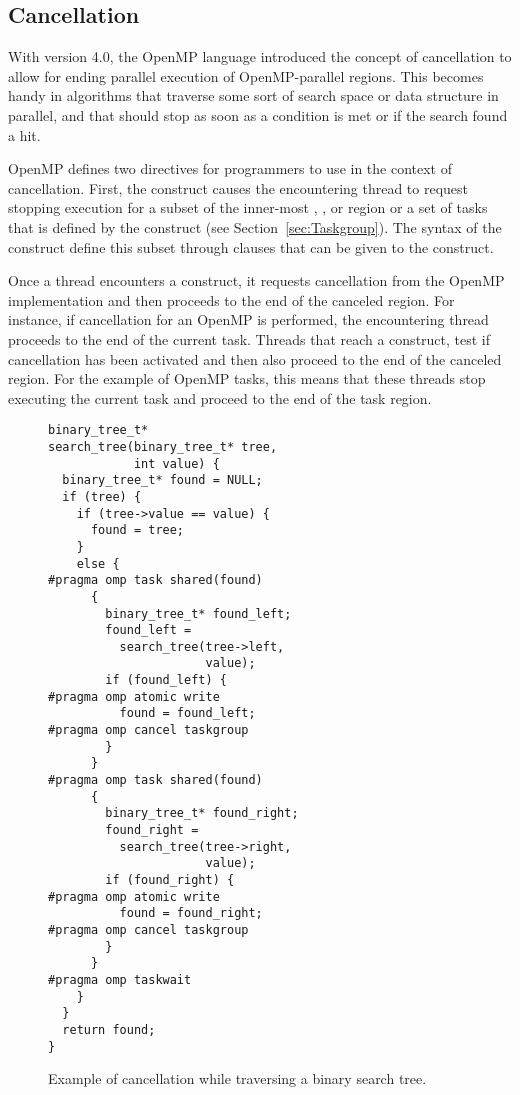 \subsection{Cancellation}
\label{sec:Cancellation}
With version 4.0, the OpenMP language introduced the concept of cancellation to allow for ending parallel execution of OpenMP-parallel regions.
This becomes handy in algorithms that traverse some sort of search space or data structure in parallel, and that should stop as soon as a condition is met or if the search found a hit.

OpenMP defines two directives for programmers to use in the context of cancellation.
First, the  construct causes the encountering thread to request stopping execution for a subset of the inner-most , ,  or  region or a set of tasks that is defined by the  construct (see Section~\ref{sec:Taskgroup}).
The syntax of the  construct define this subset through clauses that can be given to the construct.

Once a thread encounters a  construct, it requests cancellation from the OpenMP implementation and then proceeds to the end of the canceled region.
For instance, if cancellation for an OpenMP  is performed, the encountering thread proceeds to the end of the current task.
Threads that reach a  construct, test if cancellation has been activated and then also proceed to the end of the canceled region.
For the example of OpenMP tasks, this means that these threads stop executing the current task and proceed to the end of the task region.

\begin{figure}
\begin{verbatim}
binary_tree_t*
search_tree(binary_tree_t* tree,
            int value) {
  binary_tree_t* found = NULL;
  if (tree) {
    if (tree->value == value) {
      found = tree;
    }
    else {
#pragma omp task shared(found)
      {
        binary_tree_t* found_left;
        found_left =
          search_tree(tree->left,
                      value);
        if (found_left) {
#pragma omp atomic write
          found = found_left;
#pragma omp cancel taskgroup
        }
      }
#pragma omp task shared(found)
      {
        binary_tree_t* found_right;
        found_right =
          search_tree(tree->right,
                      value);
        if (found_right) {
#pragma omp atomic write
          found = found_right;
#pragma omp cancel taskgroup
        }
      }
#pragma omp taskwait
    }
  }
  return found;
}
\end{verbatim}
\caption{Example of cancellation while traversing a binary search tree.\label{fig:Cancellation}}
\end{figure}

